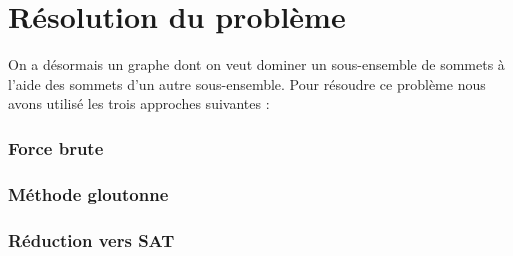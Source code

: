 \part{Résolution du problème}

On a désormais un graphe dont on veut dominer un sous-ensemble de sommets à l'aide des sommets d'un autre sous-ensemble. Pour résoudre ce problème nous avons utilisé les trois approches suivantes :

\section{Force brute}

\section{Méthode gloutonne}

\section{Réduction vers SAT}